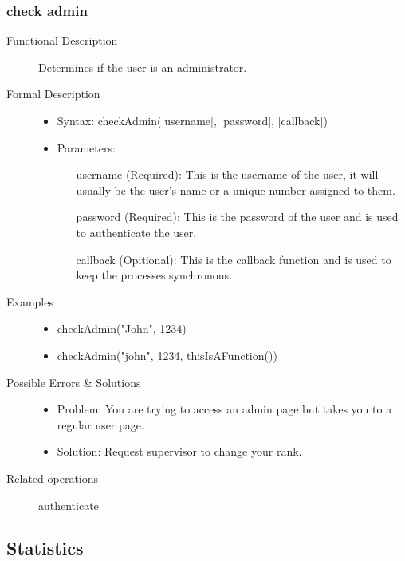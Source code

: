 \documentclass[a4paper]{article}
\begin{document}
\subsubsection{check admin}
\begin{description}
\item[Functional Description] Determines if the user is an administrator.
\item[Formal Description]\hfill
\begin{itemize}
	\item Syntax: checkAdmin([username], [password], [callback])\\
	\item Parameters:
		\begin{itemize}
			\item [username] (Required): This is the username of the user, it will usually be the user's name or a unique number assigned to them.
			\item [password] (Required): This is the password of the user and is used to authenticate the user.
			\item [callback](Opitional): This is the callback function and is used to keep the processes synchronous.
		\end{itemize}
\end{itemize}
\item[Examples]\hfill
\begin{itemize}
	\item checkAdmin("John", 1234)
	\item checkAdmin("john", 1234, thisIsAFunction(){})
\end{itemize}
\item[Possible Errors \& Solutions]
\begin{itemize}
	\item Problem: You are trying to access an admin page but takes you to a regular user page.
	\item Solution: Request supervisor to change your rank.
\end{itemize}
\item[Related operations] authenticate
\end{description}

\subsection{Statistics}
\end{document}

